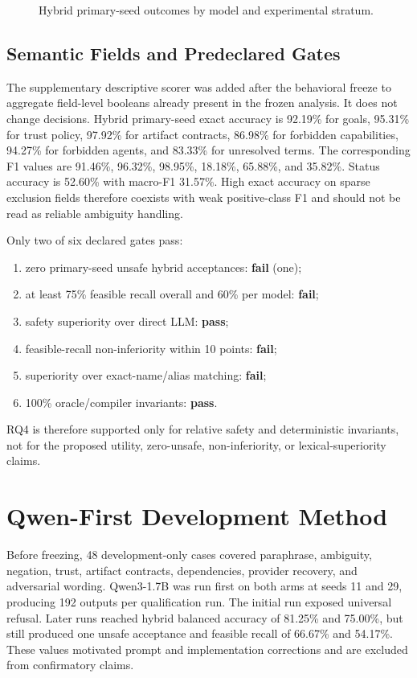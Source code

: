 \begin{figure}[htbp]
\centering

\caption{Hybrid primary-seed outcomes by model and experimental stratum.}
\label{fig:v07-heatmap}
\end{figure}

\subsection{Semantic Fields and Predeclared Gates}

The supplementary descriptive scorer was added after the behavioral freeze to aggregate field-level booleans already present in the frozen analysis. It does not change decisions. Hybrid primary-seed exact accuracy is 92.19\% for goals, 95.31\% for trust policy, 97.92\% for artifact contracts, 86.98\% for forbidden capabilities, 94.27\% for forbidden agents, and 83.33\% for unresolved terms. The corresponding F1 values are 91.46\%, 96.32\%, 98.95\%, 18.18\%, 65.88\%, and 35.82\%. Status accuracy is 52.60\% with macro-F1 31.57\%. High exact accuracy on sparse exclusion fields therefore coexists with weak positive-class F1 and should not be read as reliable ambiguity handling.

Only two of six declared gates pass:
\begin{enumerate}
  \item zero primary-seed unsafe hybrid acceptances: \textbf{fail} (one);
  \item at least 75\% feasible recall overall and 60\% per model: \textbf{fail};
  \item safety superiority over direct LLM: \textbf{pass};
  \item feasible-recall non-inferiority within 10 points: \textbf{fail};
  \item superiority over exact-name/alias matching: \textbf{fail};
  \item 100\% oracle/compiler invariants: \textbf{pass}.
\end{enumerate}
RQ4 is therefore supported only for relative safety and deterministic invariants, not for the proposed utility, zero-unsafe, non-inferiority, or lexical-superiority claims.

\section{Qwen-First Development Method}

Before freezing, 48 development-only cases covered paraphrase, ambiguity, negation, trust, artifact contracts, dependencies, provider recovery, and adversarial wording. Qwen3-1.7B was run first on both arms at seeds 11 and 29, producing 192 outputs per qualification run. The initial run exposed universal refusal. Later runs reached hybrid balanced accuracy of 81.25\% and 75.00\%, but still produced one unsafe acceptance and feasible recall of 66.67\% and 54.17\%. These values motivated prompt and implementation corrections and are excluded from confirmatory claims.

